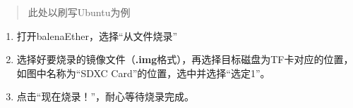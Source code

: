 \begin{quote}
此处以刷写Ubuntu为例
\end{quote}

\begin{enumerate}
\def\labelenumi{\arabic{enumi}.}
\tightlist
\item
  打开balenaEther，选择``从文件烧录''
\item
  选择好要烧录的镜像文件（\textbf{.img}格式），再选择目标磁盘为TF卡对应的位置，如图中名称为``SDXC
  Card''的位置，选中并选择``选定1''。
\item
  点击``现在烧录！''，耐心等待烧录完成。

\end{enumerate}
